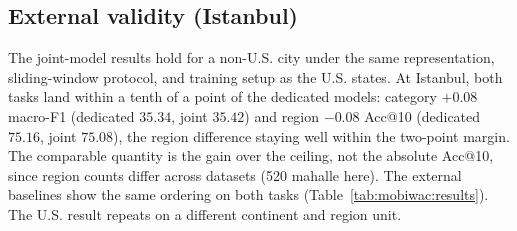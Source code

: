 
\subsection{External validity (Istanbul)}
\label{sec:mobiwac:results-external}
The joint-model results hold for a non-U.S. city under the same representation, sliding-window protocol, and training setup as the U.S. states. At Istanbul, both
tasks land within a tenth of a point of the dedicated models: category $+0.08$ macro-F1
(dedicated $35.34$, joint $35.42$) and region $-0.08$ Acc@10 (dedicated $75.16$, joint $75.08$),
the region difference staying well within the two-point margin. The comparable quantity is the gain over the ceiling, not the absolute
Acc@10, since region counts differ across datasets (520 mahalle here). The external baselines show the same ordering on both tasks
(Table~\ref{tab:mobiwac:results}).
The U.S. result repeats on a different continent and region unit.
